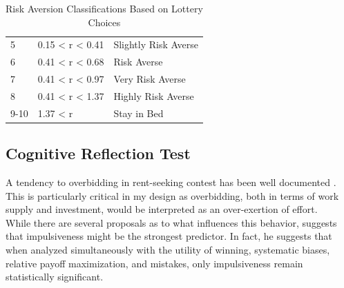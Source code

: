\begin{table}[]
\begin{tabular}{lll}
    5                                                                 & 0.15 < r < 0.41                                                           & Slightly Risk Averse                                                      \\
    6                                                                 & 0.41 < r < 0.68                                                           & Risk Averse                                                               \\
    7                                                                 & 0.41 < r < 0.97                                                           & Very Risk Averse                                                          \\
    8                                                                 & 0.41 < r < 1.37                                                           & Highly Risk Averse                                                        \\
    9-10                                                              & 1.37 < r                                                                  & Stay in Bed\\
    \hline
    \end{tabular}
    \caption{Risk Aversion Classifications Based on Lottery Choices\\ \citep{holt2002}}
    \label{table:HL}
    \end{table}
    
    \subsection{Cognitive Reflection Test}
    \label{ss:CRT}
    
    A tendency to overbidding in rent-seeking contest has been well documented \citep{sheremeta2013, dechenaux2015}. This is particularly critical in my design as overbidding, both in terms of work supply and investment, would be interpreted as an over-exertion of effort.\\
     
    While there are several proposals as to what influences this behavior, \cite{sheremeta2016} suggests that impulsiveness might be the strongest predictor. In fact, he suggests that when analyzed simultaneously with the utility of winning, systematic biases, relative payoff maximization, and mistakes, only impulsiveness remain statistically significant.\\
    
